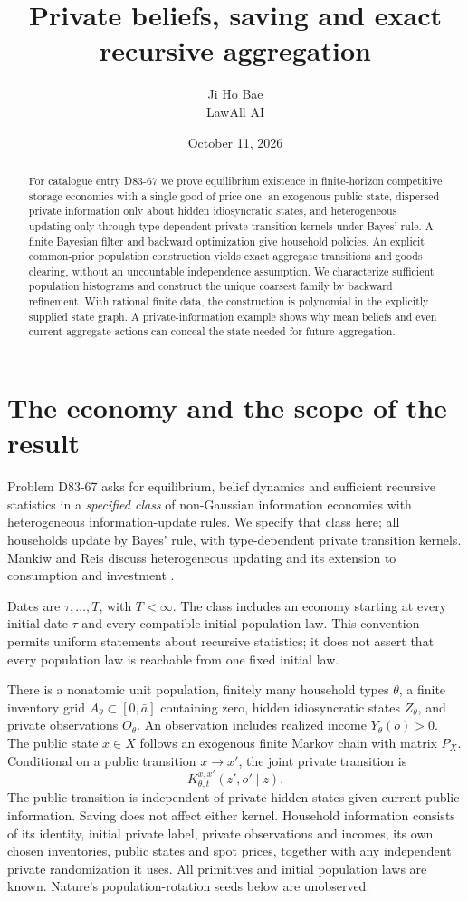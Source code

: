 \documentclass[11pt]{article}
\title{Private beliefs, saving and exact recursive aggregation}
\author{Ji Ho Bae\\\small LawAll AI}
\date{October 11, 2026}
\begin{document}
\maketitle
\begin{abstract}
For catalogue entry D83-67 we prove equilibrium existence in finite-horizon competitive storage economies with a single good of price one, an exogenous public state, dispersed private information only about hidden idiosyncratic states, and heterogeneous updating only through type-dependent private transition kernels under Bayes' rule. A finite Bayesian filter and backward optimization give household policies. An explicit common-prior population construction yields exact aggregate transitions and goods clearing, without an uncountable independence assumption. We characterize sufficient population histograms and construct the unique coarsest family by backward refinement. With rational finite data, the construction is polynomial in the explicitly supplied state graph. A private-information example shows why mean beliefs and even current aggregate actions can conceal the state needed for future aggregation.
\end{abstract}

\section{The economy and the scope of the result}
Problem D83-67 asks for equilibrium, belief dynamics and sufficient recursive statistics in a \emph{specified class} of non-Gaussian information economies with heterogeneous information-update rules. We specify that class here; all households update by Bayes' rule, with type-dependent private transition kernels. Mankiw and Reis discuss heterogeneous updating and its extension to consumption and investment \cite[\S\S7.2, 7.4--7.5]{MR}.

Dates are $\tau,\ldots,T$, with $T<\infty$. The class includes an economy starting at every initial date $\tau$ and every compatible initial population law. This convention permits uniform statements about recursive statistics; it does not assert that every population law is reachable from one fixed initial law.

There is a nonatomic unit population, finitely many household types $\theta$, a finite inventory grid $A_\theta\subset[0,\bar a]$ containing zero, hidden idiosyncratic states $Z_\theta$, and private observations $O_\theta$. An observation includes realized income $Y_\theta(o)>0$. The public state $x\in X$ follows an exogenous finite Markov chain with matrix $P_X$. Conditional on a public transition $x\to x'$, the joint private transition is
\[
 K_{\theta,t}^{x,x'}(z',o'\mid z).
\]
The public transition is independent of private hidden states given current public information. Saving does not affect either kernel. Household information consists of its identity, initial private label, private observations and incomes, its own chosen inventories, public states and spot prices, together with any independent private randomization it uses. All primitives and initial population laws are known. Nature's population-rotation seeds below are unobserved.
\end{document}
